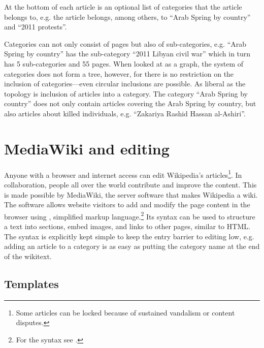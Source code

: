 At the bottom of each article is an optional list of categories that the article belongs to, e.g. the article  belongs, among others, to ``Arab Spring by country'' and ``2011 protests''.

Categories can not only consist of pages but also of sub-categories, e.g. ``Arab Spring by country'' has the sub-category ``2011 Libyan civil war'' which in turn has 5 sub-categories and 55 pages.
When looked at as a graph, the system of categories does not form a tree, however, for there is no restriction on the inclusion of categories---even circular inclusions are possible.
As liberal as the topology is inclusion of articles into a category.
The category ``Arab Spring by country'' does not only contain articles covering the Arab Spring by country, but also articles about killed individuals, e.g. ``Zakariya Rashid Hassan al-Ashiri''. 

\section{MediaWiki and editing}

Anyone with a browser and internet access can edit Wikipedia's articles\footnote{Some articles can be locked because of sustained vandalism or content disputes.\cite{wpprotectionpolicy}}.
In collaboration, people all over the world contribute and improve the content. 
This is made possible by MediaWiki, the server software that makes Wikipedia a wiki. 
The software allows website visitors to add and modify the page content in the browser using , simplified markup language.\footnote{For the syntax see .}
Its syntax can be used to structure a text into sections, embed images, and links to other pages, similar to \ac{HTML}.
The syntax is explicitly kept simple to keep the entry barrier to editing low, e.g. adding an article  to a category is as easy as putting the category name at the end of the wikitext.

\subsection{Templates}\label{sub:templates}

